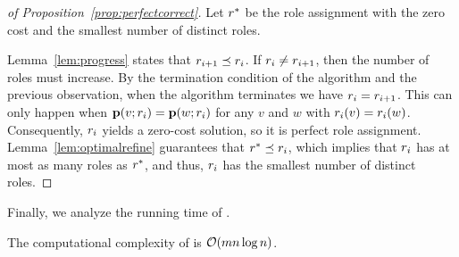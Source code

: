 \begin{proof}[of Proposition~\ref{prop:perfectcorrect}]
Let $r^*$ be the role assignment with the zero cost and the smallest
number of distinct roles.

Lemma~\ref{lem:progress} states that $r_{i + 1} \preceq r_i$. 
If $r_i \neq r_{i + 1}$, then the number of roles must increase. 
By the termination condition of the algorithm
and the previous observation, 
when the algorithm terminates we have $r_{i} = r_{i + 1}$. 
This can only happen when
$\prof{v; \role_i} = \prof{w; \role_i}$ for any $v$ and $w$ with $r_i(v) = r_i(w)$. 
Consequently, $r_i$ yields a zero-cost solution, so it is perfect role assignment. 
Lemma~\ref{lem:optimalrefine} guarantees that $r^* \preceq r_i$, 
which implies that $r_i$ has at most as many roles as $r^*$, 
and thus, $r_i$ has the smallest number of distinct roles.
\end{proof}
\fi

Finally, we analyze the running time of \algperfect.

\begin{proposition}
The computational complexity of \algperfect is $\bigO{mn \log n}$.
\label{prop:exacttime}
\end{proposition}

